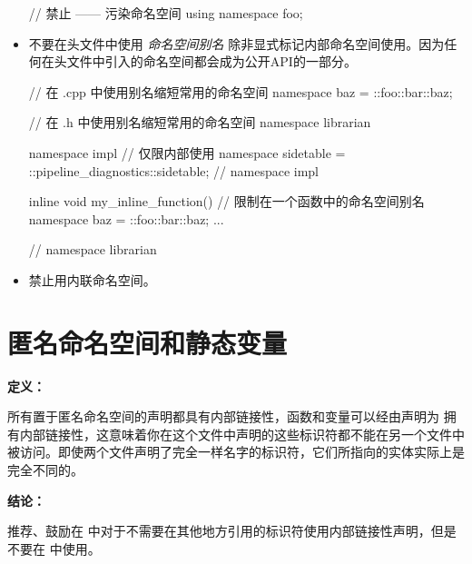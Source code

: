 \begin{itemize}
\begin{cppcode}
// 禁止 —— 污染命名空间
using namespace foo;
\end{cppcode}

  \item  不要在头文件中使用 \textit{命名空间别名} 除非显式标记内部命名空间使用。因为任何在头文件中引入的命名空间都会成为公开API的一部分。

\begin{cppcode}
// 在 .cpp 中使用别名缩短常用的命名空间
namespace baz = ::foo::bar::baz;
\end{cppcode}

\begin{cppcode}
// 在 .h 中使用别名缩短常用的命名空间
namespace librarian {
namespace impl {  // 仅限内部使用
namespace sidetable = ::pipeline_diagnostics::sidetable;
}  // namespace impl

inline void my_inline_function() {
  // 限制在一个函数中的命名空间别名
  namespace baz = ::foo::bar::baz;
...
}
}  // namespace librarian
\end{cppcode}

  \item  禁止用内联命名空间。
\end{itemize}

\section{匿名命名空间和静态变量} \label{unnamed-namespace-and-static-variables}


\textbf{定义：}

所有置于匿名命名空间的声明都具有内部链接性，函数和变量可以经由声明为  拥有内部链接性，这意味着你在这个文件中声明的这些标识符都不能在另一个文件中被访问。即使两个文件声明了完全一样名字的标识符，它们所指向的实体实际上是完全不同的。

\textbf{结论：}

推荐、鼓励在  中对于不需要在其他地方引用的标识符使用内部链接性声明，但是不要在  中使用。


